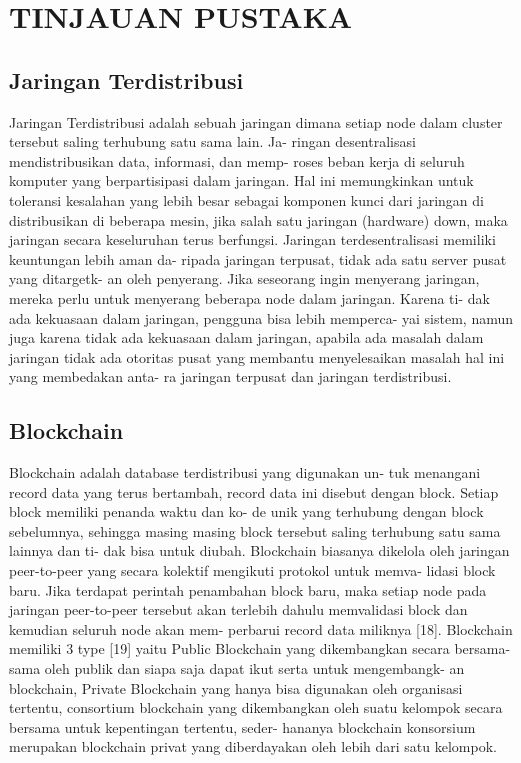 \section{TINJAUAN PUSTAKA}


\subsection{Jaringan Terdistribusi}

Jaringan Terdistribusi adalah sebuah jaringan dimana setiap
node dalam cluster tersebut saling terhubung satu sama lain. Ja-
ringan desentralisasi mendistribusikan data, informasi, dan memp-
roses beban kerja di seluruh komputer yang berpartisipasi dalam
jaringan. Hal ini memungkinkan untuk toleransi kesalahan yang
lebih besar sebagai komponen kunci dari jaringan di distribusikan
di beberapa mesin, jika salah satu jaringan (hardware) down, maka
jaringan secara keseluruhan terus berfungsi.
Jaringan terdesentralisasi memiliki keuntungan lebih aman da-
ripada jaringan terpusat, tidak ada satu server pusat yang ditargetk-
an oleh penyerang. Jika seseorang ingin menyerang jaringan, mereka
perlu untuk menyerang beberapa node dalam jaringan. Karena ti-
dak ada kekuasaan dalam jaringan, pengguna bisa lebih memperca-
yai sistem, namun juga karena tidak ada kekuasaan dalam jaringan,
apabila ada masalah dalam jaringan tidak ada otoritas pusat yang
membantu menyelesaikan masalah hal ini yang membedakan anta-
ra jaringan terpusat dan jaringan terdistribusi.

\subsection{Blockchain}

Blockchain adalah database terdistribusi yang digunakan un-
tuk menangani record data yang terus bertambah, record data ini
disebut dengan block. Setiap block memiliki penanda waktu dan ko-
de unik yang terhubung dengan block sebelumnya, sehingga masing
masing block tersebut saling terhubung satu sama lainnya dan ti-
dak bisa untuk diubah. Blockchain biasanya dikelola oleh jaringan
peer-to-peer yang secara kolektif mengikuti protokol untuk memva-
lidasi block baru. Jika terdapat perintah penambahan block baru,
maka setiap node pada jaringan peer-to-peer tersebut akan terlebih
dahulu memvalidasi block dan kemudian seluruh node akan mem-
perbarui record data miliknya [18]. Blockchain memiliki 3 type [19]
yaitu Public Blockchain yang dikembangkan secara bersama-sama
oleh publik dan siapa saja dapat ikut serta untuk mengembangk-
an blockchain, Private Blockchain yang hanya bisa digunakan oleh
organisasi tertentu, consortium blockchain yang dikembangkan oleh
suatu kelompok secara bersama untuk kepentingan tertentu, seder-
hananya blockchain konsorsium merupakan blockchain privat yang
diberdayakan oleh lebih dari satu kelompok.
